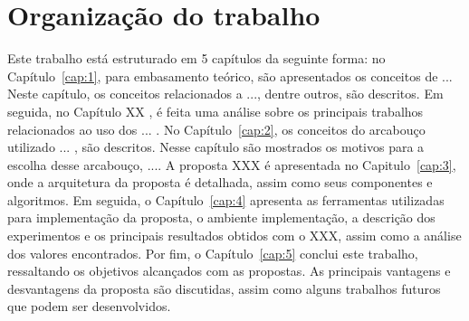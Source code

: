 \section{Organização do trabalho}\label{sec:1_org}

Este trabalho está estruturado em 5 capítulos da seguinte forma: no Capítulo~\ref{cap:1}, para embasamento teórico, são apresentados os conceitos de ... Neste capítulo, os conceitos relacionados a ..., dentre outros, são descritos. Em seguida, no Capítulo XX , é feita uma análise sobre os principais trabalhos relacionados ao uso dos ... . No Capítulo~\ref{cap:2}, os conceitos do arcabouço utilizado ... , são descritos. Nesse capítulo são mostrados os motivos para a escolha desse arcabouço, .... A proposta XXX é apresentada no Capitulo~\ref{cap:3}, onde a arquitetura da proposta é detalhada, assim como seus componentes e algoritmos. Em seguida, o Capítulo~\ref{cap:4} apresenta as ferramentas utilizadas para implementação da proposta, o ambiente implementação, a descrição dos experimentos e os principais resultados obtidos com o XXX, assim como a análise dos valores encontrados. Por fim, o Capítulo~\ref{cap:5} conclui este trabalho, ressaltando os objetivos alcançados com as propostas. As principais vantagens e desvantagens da proposta são discutidas, assim como alguns trabalhos futuros que podem ser desenvolvidos. 
